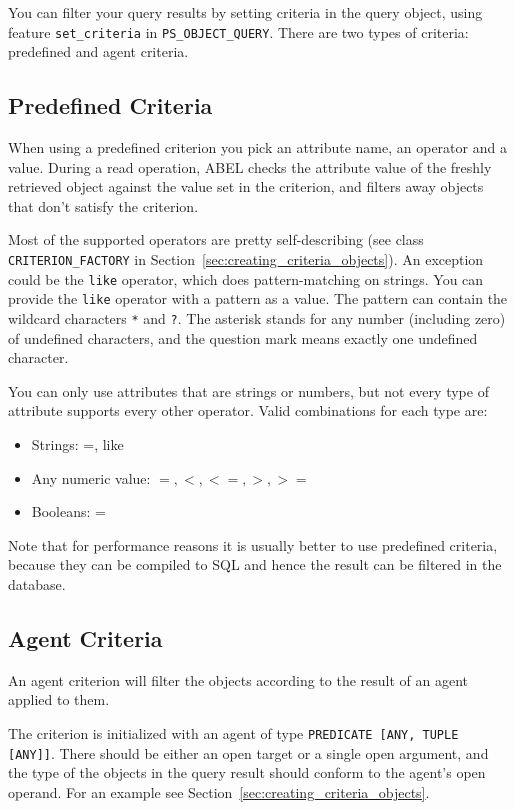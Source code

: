 \documentclass[a4paper,12pt]{report}
\begin{document}
You can filter your query results by setting criteria in the query object, using feature \lstinline{set_criteria} in \lstinline{PS_OBJECT_QUERY}.
There are two types of criteria: predefined and agent criteria.

\subsection{Predefined Criteria}
When using a predefined criterion you pick an attribute name, an operator and a value. 
During a read operation, ABEL checks the attribute value of the freshly retrieved object against the value set in the criterion, and filters away objects that don't satisfy the criterion.

Most of the supported operators are pretty self-describing (see class \lstinline{CRITERION_FACTORY} in Section~\ref{sec:creating_criteria_objects}).
An exception could be the \lstinline!like! operator, which does pattern-matching on strings.
You can provide the \lstinline!like! operator with a pattern as a value. The pattern can contain the wildcard characters \lstinline!*! and \lstinline!?!.
The asterisk stands for any number (including zero) of undefined characters, and the question mark means exactly one undefined character.

You can only use attributes that are strings or numbers, but not every type of attribute supports every other operator. Valid combinations for each type are:

 \begin{itemize}
  \item Strings: =, like
  \item Any numeric value: $=, <, <=, >, >=$
  \item Booleans: =
 \end{itemize}

Note that for performance reasons it is usually better to use predefined criteria, because they can be compiled to SQL and hence the result can be filtered in the database.

\subsection{Agent Criteria}

An agent criterion will filter the objects according to the result of an agent applied to them.

The criterion is initialized with an agent of type \lstinline!PREDICATE [ANY, TUPLE [ANY]]!. 
There should be either an open target or a single open argument, and the type of the objects in the query result should conform to the agent's open operand. For an example see Section~\ref{sec:creating_criteria_objects}.
\end{document}
